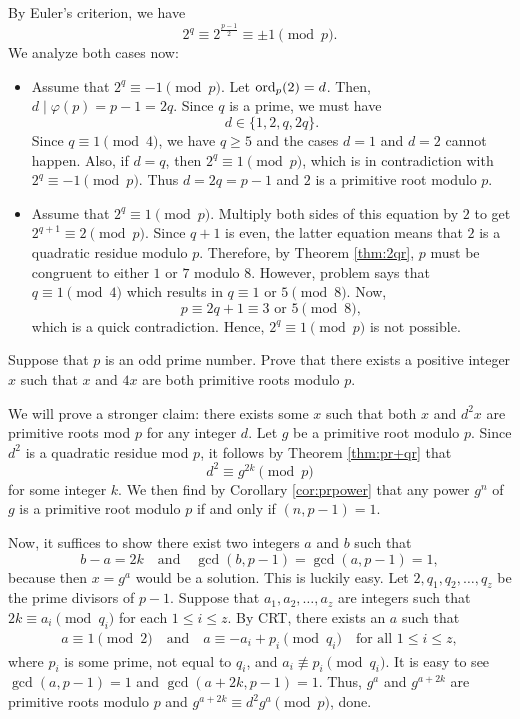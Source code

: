 \documentclass{subfile}
\begin{document}
	\begin{solution}
		By Euler's criterion, we have
		\[2^q \equiv 2^{\frac{p-1}{2}} \equiv \pm 1 \pmod{p}.\]
		 We analyze both cases now:
			\begin{itemize}
				\item Assume that $2^q \equiv -1 \pmod p$. Let $\operatorname{ord}_p(2)=d$. Then, $d\mid \varphi(p)=p-1=2q$. Since $q$ is a prime, we must have $$d \in \{1,2,q,2q\}.$$ Since $q \equiv 1 \pmod 4$, we have $q \geq 5$ and the cases $d=1$ and $d=2$ cannot happen. Also, if $d=q$, then $2^q \equiv 1 \pmod p$, which is in contradiction with $2^q \equiv -1 \pmod p$. Thus $d=2q=p-1$ and $2$ is a primitive root modulo $p$.
				\item Assume that $2^q \equiv 1 \pmod{p}$. Multiply both sides of this equation by $2$ to get $2^{q+1} \equiv 2 \pmod p$. Since $q+1$ is even, the latter equation means that $2$ is a quadratic residue modulo $p$. Therefore, by Theorem \ref{thm:2qr}, $p$ must be congruent to either $1$ or $7$ modulo $8$. However, problem says that $q \equiv 1 \pmod 4$ which results in $q \equiv 1$ or $5 \pmod 8$. Now,
				\[p \equiv 2q +1 \equiv 3 \text{ or } 5 \pmod 8,\]
				which is a quick contradiction. Hence, $2^q \equiv 1 \pmod{p}$ is not possible.
			\end{itemize}

	\end{solution}
	
	\begin{problem}
		Suppose that $p$ is an odd prime number. Prove that there exists a positive integer $x$ such that $x$ and $4x$ are both primitive roots modulo $p$.
	\end{problem}
	
	\begin{solution}
		We will prove a stronger claim: there exists some $x$ such that both $x$ and $d^2x$ are primitive roots mod $p$ for any integer $d$. Let $g$ be a primitive root modulo $p$. Since $d^2$ is a quadratic residue mod $p$, it follows by Theorem \ref{thm:pr+qr} that $$d^2 \equiv g^{2k} \pmod{p}$$ for some integer $k$. We then find by Corollary \ref{cor:prpower} that any power $g^n$ of $g$ is a primitive root modulo $p$ if and only if $(n, p-1)=1$.
		
		Now, it suffices to show there exist two integers $a$ and $b$ such that $$b-a = 2k \quad \text{and} \quad \gcd(b,p-1) = \gcd(a,p-1) = 1,$$ because then $x=g^a$ would be a solution.
		This is luckily easy. Let $2,q_1,q_2,\ldots,q_z$ be the prime divisors of $p-1$. Suppose that $a_1,a_2,\ldots,a_z$ are integers such that $2k \equiv a_i \pmod{q_i}$ for each $1 \le i \le z$.
		By CRT, there exists an $a$ such that 
			\begin{align*}
				a \equiv 1 \pmod{2} \quad \text{and} \quad a \equiv -a_i + p_i \pmod{q_i}\quad \text{for all } 1 \le i \le z,
			\end{align*}
		where $p_i$ is some prime, not equal to $q_i$, and $a_i \not \equiv p_i \pmod{q_i}$. It is easy to see $\gcd(a,p-1) = 1$ and $\gcd(a+2k, p-1) = 1$. Thus, $g^a$ and $g^{a+2k}$ are primitive roots modulo $p$ and $g^{a+2k} \equiv d^2g^a \pmod{p}$, done.
	\end{solution}
	
\end{document}
